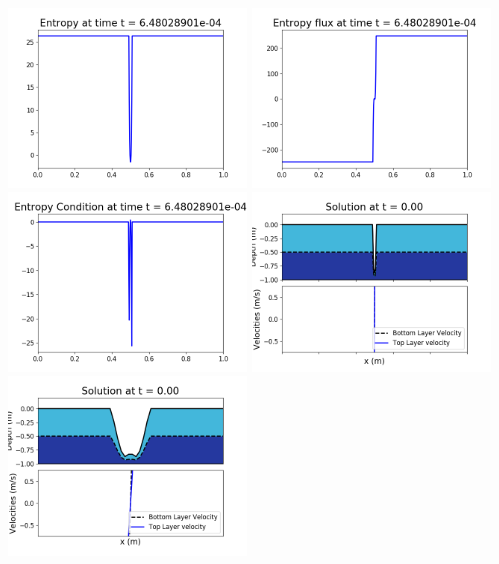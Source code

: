 \documentclass[11pt]{article}
\begin{document}
\vskip 10pt 
\includegraphics[width=0.475\textwidth]{frame0005fig1007.png}
\includegraphics[width=0.475\textwidth]{frame0005fig1008.png}
\vskip 10pt 
\includegraphics[width=0.475\textwidth]{frame0005fig1009.png}
\vskip 10pt 
\includegraphics[width=0.475\textwidth]{frame0006fig1001.png}
\includegraphics[width=0.475\textwidth]{frame0006fig1002.png}
\end{document}
